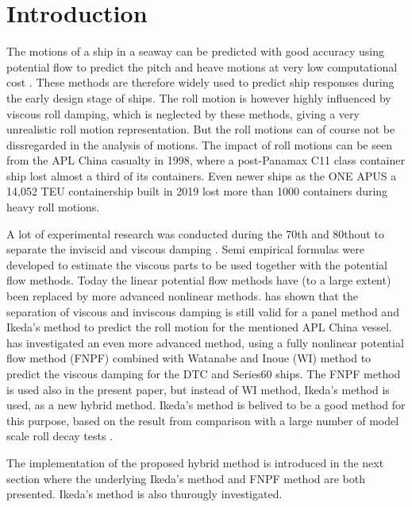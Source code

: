 \section{Introduction}\label{introduction}

The motions of a ship in a seaway can be predicted with good accuracy
using potential flow to predict the pitch and heave motions at very low
computational cost \cite{7505983/FB64RGPF}. These methods are therefore
widely used to predict ship responses during the early design stage of
ships. The roll motion is however highly influenced by viscous roll
damping, which is neglected by these methods, giving a very unrealistic
roll motion representation. But the roll motions can of course not be
dissregarded in the analysis of motions. The impact of roll motions can
be seen from the APL China casualty in 1998, where a post-Panamax C11
class container ship lost almost a third of its containers. Even newer
ships as the ONE APUS a 14,052 TEU containership built in 2019 lost more
than 1000 containers during heavy roll motions.

A lot of experimental research was conducted during the 70th and 80thout
to separate the inviscid and viscous damping \cite{7505983/937PN5DT}.
Semi empirical formulas were developed to estimate the viscous parts to
be used together with the potential flow methods. Today the linear
potential flow methods have (to a large extent) been replaced by more
advanced nonlinear methods. \cite{7505983/UGK6YEVD} has shown that the
separation of viscous and inviscous damping is still valid for a panel
method and Ikeda's method to predict the roll motion for the mentioned
APL China vessel. \cite{7505983/24TNAV5Z} has investigated an even more
advanced method, using a fully nonlinear potential flow method (FNPF)
combined with Watanabe and Inoue (WI) method to predict the viscous
damping for the DTC \cite{7505983/BYNJ8CFG} and Series60 ships. The FNPF
method is used also in the present paper, but instead of WI method,
Ikeda's method is used, as a new hybrid method. Ikeda's method is
belived to be a good method for this purpose, based on the result from
comparison with a large number of model scale roll decay tests
\cite{7505983/QMGQ76Q9}.

The implementation of the proposed hybrid method is introduced in the
next section where the underlying Ikeda's method and FNPF method are
both presented. Ikeda's method is also thurougly investigated.

    